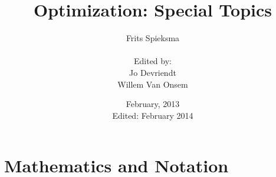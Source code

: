 \documentclass[titlepage]{book}
\title{Optimization: Special Topics}
\author{Frits Spieksma\\ \\Edited by:\\Jo Devriendt\\Willem Van Onsem}
\date{February, 2013\\Edited: February 2014}
\theoremstyle{plain}
\theoremstyle{definition}
\theoremstyle{remark}
\begin{document}
\begin{titlepage}
\maketitle
\end{titlepage}
\tableofcontents

















\appendix
\chapter{Mathematics and Notation}



\printindex
\glsaddall
{}
\printglossaries
\end{document}

